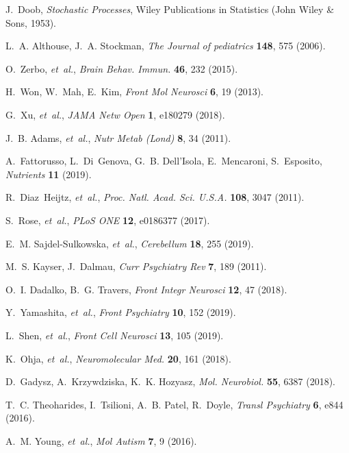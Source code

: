 \documentclass[onecolumn,,10pt]{IEEEtran}
\begin{document}
\begin{thebibliography}{10}
J.~Doob, {\it Stochastic Processes\/}, Wiley Publications in Statistics (John
  Wiley \& Sons, 1953).

L.~A. Althouse, J.~A. Stockman, {\it The Journal of pediatrics\/} {\bf 148},
  575 (2006).

O.~Zerbo, {\it et~al.\/}, {\it Brain Behav. Immun.\/} {\bf 46}, 232 (2015).

H.~Won, W.~Mah, E.~Kim, {\it Front Mol Neurosci\/} {\bf 6}, 19 (2013).

G.~Xu, {\it et~al.\/}, {\it JAMA Netw Open\/} {\bf 1}, e180279 (2018).

J.~B. Adams, {\it et~al.\/}, {\it Nutr Metab (Lond)\/} {\bf 8}, 34 (2011).

A.~Fattorusso, L.~Di~Genova, G.~B. Dell'Isola, E.~Mencaroni, S.~Esposito, {\it
  Nutrients\/} {\bf 11} (2019).

R.~Diaz~Heijtz, {\it et~al.\/}, {\it Proc. Natl. Acad. Sci. U.S.A.\/} {\bf
  108}, 3047 (2011).

S.~Rose, {\it et~al.\/}, {\it PLoS ONE\/} {\bf 12}, e0186377 (2017).

E.~M. Sajdel-Sulkowska, {\it et~al.\/}, {\it Cerebellum\/} {\bf 18}, 255
  (2019).

M.~S. Kayser, J.~Dalmau, {\it Curr Psychiatry Rev\/} {\bf 7}, 189 (2011).

O.~I. Dadalko, B.~G. Travers, {\it Front Integr Neurosci\/} {\bf 12}, 47
  (2018).

Y.~Yamashita, {\it et~al.\/}, {\it Front Psychiatry\/} {\bf 10}, 152 (2019).

L.~Shen, {\it et~al.\/}, {\it Front Cell Neurosci\/} {\bf 13}, 105 (2019).

K.~Ohja, {\it et~al.\/}, {\it Neuromolecular Med.\/} {\bf 20}, 161 (2018).

D.~Gadysz, A.~Krzywdziska, K.~K. Hozyasz, {\it Mol. Neurobiol.\/} {\bf 55},
  6387 (2018).

T.~C. Theoharides, I.~Tsilioni, A.~B. Patel, R.~Doyle, {\it Transl
  Psychiatry\/} {\bf 6}, e844 (2016).

A.~M. Young, {\it et~al.\/}, {\it Mol Autism\/} {\bf 7}, 9 (2016).


\end{thebibliography}
\end{document}
